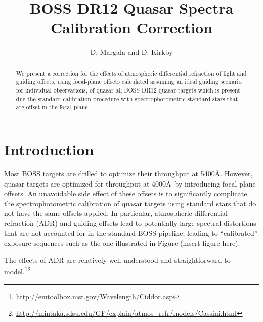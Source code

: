 \documentclass[preprint2]{aastex}
\begin{document}
\title{BOSS DR12 Quasar Spectra Calibration Correction}


\author{D. Margala and D. Kirkby}

\begin{abstract}
We present a correction for the effects of atmospheric differential refraction of light and guiding offsets, using focal-plane offsets calculated assuming an ideal guiding scenario for individual observations, of quasar all BOSS DR12 quasar targets which is present due the standard calibration procedure with spectrophotometric standard stars that are offset in the focal plane.
\end{abstract}


\section{Introduction}

Most BOSS targets are drilled to optimize their throughput at 5400\AA. However, quasar targets are optimized for throughput at 4000\AA~by introducing focal plane offsets. An unavoidable side effect of these offsets is to significantly complicate the spectrophotometric calibration of quasar targets using standard stars that do not have the same offsets applied. In particular, atmospheric differential refraction (ADR) and guiding offsets lead to potentially large spectral distortions that are not accounted for in the standard BOSS pipeline, leading to ``calibrated'' exposure sequences such as the one illustrated in Figure (insert figure here).

The effects of ADR are relatively well understood and straightforward to model.\footnote{\url{http://emtoolbox.nist.gov/Wavelength/Ciddor.asp}}\footnote{\url{http://mintaka.sdsu.edu/GF/explain/atmos_refr/models/Cassini.html}}
\end{document}
